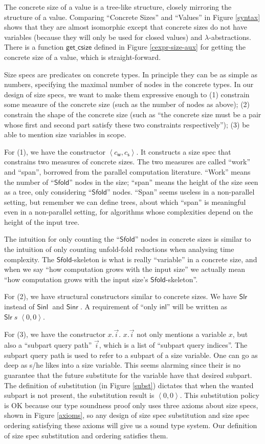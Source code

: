 \documentclass[preprint]{sigplanconf}
\newcommand{\syminl}{\mathsf{inl}}
\newcommand{\symSinl}{\mathsf{Sinl\;}}
\newcommand{\symSinr}{\mathsf{Sinr\;}}
\newcommand{\symSfold}{\mathsf{Sfold}}
\newcommand{\getcsize}{\mathsf{get\_csize}}
\newcommand{\symSlr}{\mathsf{Slr}}
\newcommand{\symwork}{\mathsf{w}}
\newcommand{\symspan}{\mathsf{s}}
\newcommand{\Sstats}[1]{\left \langle #1 \right \rangle}
\begin{document}
The concrete size of a value is a tree-like structure, closely mirroring the structure of a value. Comparing ``Concrete Sizes'' and ``Values'' in Figure \ref{syntax} shows that they are almost isomorphic except that concrete sizes do not have variables (because they will only be used for closed values) and $\lambda$-abstractions. There is a function $\getcsize$ defined in Figure \ref{cexpr-size-aux} for getting the concrete size of a value, which is straight-forward.

Size specs are predicates on concrete types. In principle they can be as simple as numbers, specifying the maximal number of nodes in the concrete types. In our design of size specs, we want to make them expressive enough to (1) constrain some measure of the concrete size (such as the number of nodes as above); (2) constrain the shape of the concrete size (such as ``the concrete size must be a pair whose first and second part satisfy these two constraints respectively''); (3) be able to mention size variables in scope.

For (1), we have the constructor $\Sstats{c_\symwork,c_\symspan}$. It constructs a size spec that constrains two measures of concrete sizes. The two measures are called ``work'' and ``span'', borrowed from the parallel computation literature. ``Work'' means the number of ``$\symSfold$'' nodes in the size; ``span'' means the height of the size seen as a tree, only considering ``$\symSfold$'' nodes. ``Span'' seems useless in a non-parallel setting, but remember we can define trees, about which ``span'' is meaningful even in a non-parallel setting, for algorithms whose complexities depend on the height of the input tree. 

The intuition for only counting the  ``$\symSfold$'' nodes in concrete sizes is similar to the intuition of only counting unfold-fold reductions when analysing time complexity. The $\symSfold$-skeleton is what is really ``variable'' in a concrete size, and when we say ``how computation grows with the input size'' we actually mean ``how computation grows with the input size's $\symSfold$-skeleton''.

For (2), we have structural constructors similar to concrete sizes. We have $\symSlr$ instead of $\symSinl$ and $\symSinr$. A requirement of ``only $\syminl$'' will be written as $\symSlr\;s\;\Sstats{0,0}$.

For (3), we have the constructor $x.\vec{i}$. $x.\vec{i}$ not only mentions a variable $x$, but also a ``subpart query path'' $\vec{i}$, which is a list of ``subpart query indices''. The subpart query path is used to refer to a subpart of a size variable. One can go as deep as s/he likes into a size variable. This seems alarming since their is no guarantee that the future substitute for the variable have that desired subpart. The definition of substitution (in Figure \ref{subst}) dictates that when the wanted subpart is not present, the substitution result is $\Sstats{0,0}$. This substitution policy is OK because our type soundness proof only uses three axioms about size specs, shown in Figure \ref{axioms}, so any design of size spec substitution and size spec ordering satisfying these axioms will give us a sound type system. Our definition of size spec substitution and ordering satisfies them. 
\end{document}
